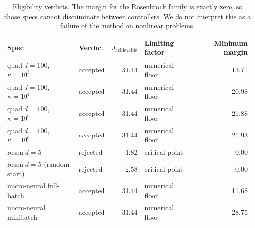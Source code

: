\begin{table}[t]
  \centering
  \begin{tabular}{llrlr}
  \toprule
  Spec & Verdict & $J_{\text{achievable}}$ & Limiting factor & Minimum margin \\
  \midrule
  quad $d{=}100$, $\kappa{=}10^3$ & accepted & 31.44 & numerical floor & 13.71 \\
  quad $d{=}100$, $\kappa{=}10^4$ & accepted & 31.44 & numerical floor & 20.98 \\
  quad $d{=}100$, $\kappa{=}10^5$ & accepted & 31.44 & numerical floor & 21.88 \\
  quad $d{=}100$, $\kappa{=}10^6$ & accepted & 31.44 & numerical floor & 21.93 \\
  rosen $d{=}5$                   & rejected & 1.82  & critical point  & $-0.00$ \\
  rosen $d{=}5$ (random start)    & rejected & 2.58  & critical point  & 0.00 \\
  micro-neural full-batch         & accepted & 31.44 & numerical floor & 11.68 \\
  micro-neural minibatch          & accepted & 31.44 & numerical floor & 28.75 \\
  \bottomrule
  \end{tabular}
  \caption{Eligibility verdicts. The margin for the Rosenbrock family is exactly
  zero, so those specs cannot discriminate between controllers. We do not
  interpret this as a failure of the method on nonlinear problems.}
  \label{tab:eligibility}
\end{table}
